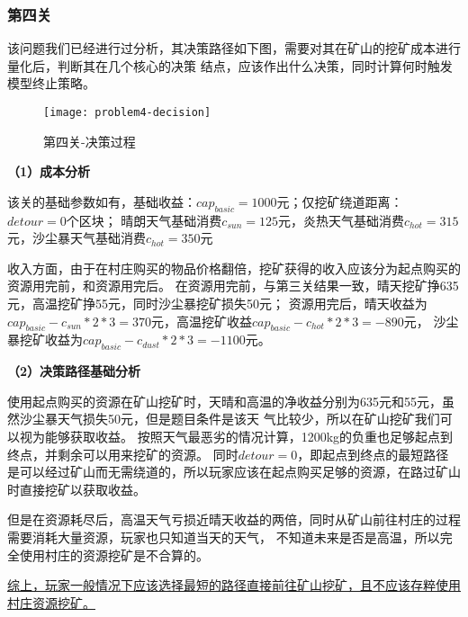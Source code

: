 \documentclass[withoutpreface,bwprint]{cumcmthesis} %
\begin{document}
\subsubsection{第四关}

该问题我们已经进行过分析，其决策路径如下图，需要对其在矿山的挖矿成本进行量化后，判断其在几个核心的决策
结点，应该作出什么决策，同时计算何时触发模型终止策略。

\begin{figure}[!h]
    \centering
    \texttt{[image: problem4-decision]}
    \caption{第四关-决策过程}
    \label{fig:problem4-decision}
\end{figure}

\textbf{（1）成本分析}

该关的基础参数如有，基础收益：$cap_{basic} = 1000$元；仅挖矿绕道距离：$detour = 0$个区块；
晴朗天气基础消费$c_{sun}=125$元，炎热天气基础消费$c_{hot}=315$元，沙尘暴天气基础消费$c_{hot}=350$元

收入方面，由于在村庄购买的物品价格翻倍，挖矿获得的收入应该分为起点购买的资源用完前，和资源用完后。
在资源用完前，与第三关结果一致，晴天挖矿挣635元，高温挖矿挣55元，同时沙尘暴挖矿损失50元；
资源用完后，晴天收益为$cap_{basic}-c_{sun}*2*3=370$元，高温挖矿收益$cap_{basic}-c_{hot}*2*3=-890$元，
沙尘暴挖矿收益为$cap_{basic}-c_{dust}*2*3=-1100$元。

\textbf{（2）决策路径基础分析}


使用起点购买的资源在矿山挖矿时，天晴和高温的净收益分别为635元和55元，虽然沙尘暴天气损失50元，但是题目条件是该天
气比较少，所以在矿山挖矿我们可以视为能够获取收益。
按照天气最恶劣的情况计算，1200kg的负重也足够起点到终点，并剩余可以用来挖矿的资源。
同时$detour=0$，即起点到终点的最短路径是可以经过矿山而无需绕道的，所以玩家应该在起点购买足够的资源，在路过矿山
时直接挖矿以获取收益。

但是在资源耗尽后，高温天气亏损近晴天收益的两倍，同时从矿山前往村庄的过程需要消耗大量资源，玩家也只知道当天的天气，
不知道未来是否是高温，所以完全使用村庄的资源挖矿是不合算的。


\uline{综上，玩家一般情况下应该选择最短的路径直接前往矿山挖矿，且不应该存粹使用村庄资源挖矿。}
\end{document}
